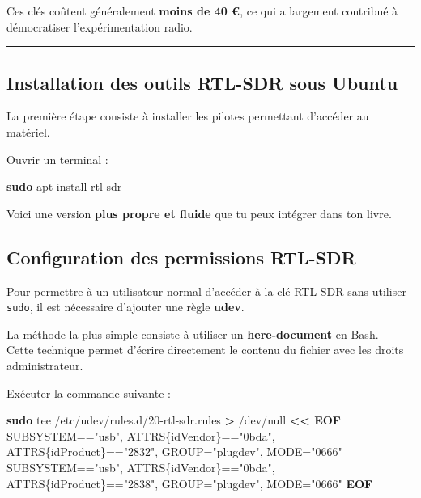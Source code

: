 \documentclass[
  french,
]{article}
\newenvironment{Shaded}{\begin{snugshade}}{\end{snugshade}}
\newcommand{\FunctionTok}[1]{\textcolor[rgb]{0.13,0.29,0.53}{\textbf{#1}}}
\newcommand{\NormalTok}[1]{#1}
\newcommand{\OperatorTok}[1]{\textcolor[rgb]{0.81,0.36,0.00}{\textbf{#1}}}
\newcommand{\StringTok}[1]{\textcolor[rgb]{0.31,0.60,0.02}{#1}}
\begin{document}
Ces clés coûtent généralement \textbf{moins de 40 €}, ce qui a largement
contribué à démocratiser l'expérimentation radio.

\begin{center}\rule{0.5\linewidth}{0.5pt}\end{center}

\subsection{Installation des outils RTL-SDR sous
Ubuntu}\label{installation-des-outils-rtl-sdr-sous-ubuntu}

La première étape consiste à installer les pilotes permettant d'accéder
au matériel.

Ouvrir un terminal :

\begin{Shaded}
\begin{Highlighting}[]
\FunctionTok{sudo}\NormalTok{ apt install rtl{-}sdr}
\end{Highlighting}
\end{Shaded}

Voici une version \textbf{plus propre et fluide} que tu peux intégrer
dans ton livre.

\subsection{Configuration des permissions
RTL-SDR}\label{configuration-des-permissions-rtl-sdr}

Pour permettre à un utilisateur normal d'accéder à la clé RTL-SDR sans
utiliser \texttt{sudo}, il est nécessaire d'ajouter une règle
\textbf{udev}.

La méthode la plus simple consiste à utiliser un \textbf{here-document}
en Bash.\\
Cette technique permet d'écrire directement le contenu du fichier avec
les droits administrateur.

Exécuter la commande suivante :

\begin{Shaded}
\begin{Highlighting}[]
\FunctionTok{sudo}\NormalTok{ tee /etc/udev/rules.d/20{-}rtl{-}sdr.rules }\OperatorTok{\textgreater{}}\NormalTok{ /dev/null }\OperatorTok{\textless{}\textless{} \textquotesingle{}EOF\textquotesingle{}}
\StringTok{SUBSYSTEM=="usb", ATTRS\{idVendor\}=="0bda", ATTRS\{idProduct\}=="2832", GROUP="plugdev", MODE="0666"}
\StringTok{SUBSYSTEM=="usb", ATTRS\{idVendor\}=="0bda", ATTRS\{idProduct\}=="2838", GROUP="plugdev", MODE="0666"}
\OperatorTok{EOF}
\end{Highlighting}
\end{Shaded}
\end{document}
